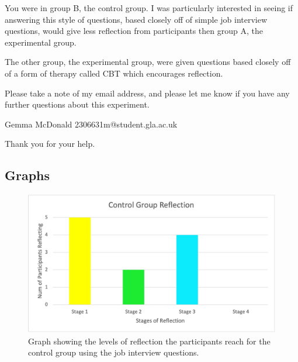 \documentclass{l4proj}
\begin{document}
\begin{appendices}
You were in group B, the control group. I was particularly interested in seeing if answering this style of questions,  based closely off of simple job interview questions, would give less reflection from participants then group A, the experimental group.

The other group, the experimental group, were given questions based closely off of a form of therapy called CBT which encourages reflection.

Please take a note of my email address, and please let me know if you have any further questions about this experiment.

Gemma McDonald
2306631m@student.gla.ac.uk

Thank you for your help.


\subsection{Graphs}

\begin{figure}[H]
    \begin{centering}
    \includegraphics[scale=0.5]{images/ABControlGraph.png}
    \caption{Graph showing the levels of reflection the participants reach for the control group using the job interview questions.}
    \label{fig: Appen-ControlGraph}
    \end{centering}
\end{figure}


\end{appendices}
\end{document}
